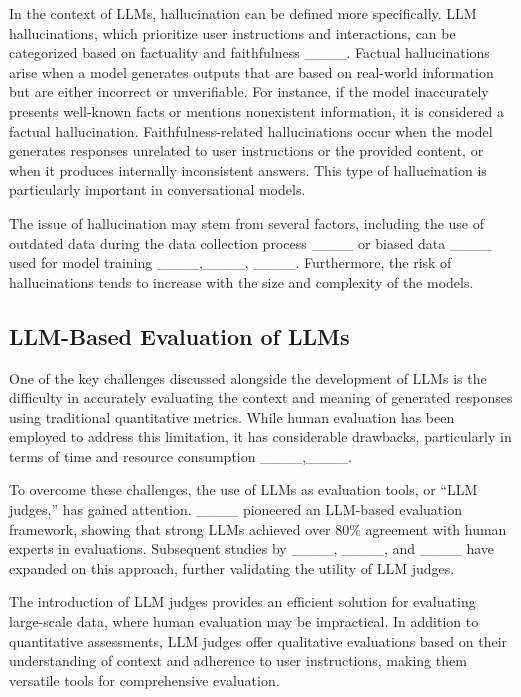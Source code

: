 In the context of LLMs, hallucination can be defined more specifically. LLM hallucinations, which prioritize user instructions and interactions, can be categorized based on factuality and faithfulness ____. Factual hallucinations arise when a model generates outputs that are based on real-world information but are either incorrect or unverifiable. For instance, if the model inaccurately presents well-known facts or mentions nonexistent information, it is considered a factual hallucination. Faithfulness-related hallucinations occur when the model generates responses unrelated to user instructions or the provided content, or when it produces internally inconsistent answers. This type of hallucination is particularly important in conversational models.

The issue of hallucination may stem from several factors, including the use of outdated data during the data collection process ____ or biased data ____ used for model training ____,____,  ____. Furthermore, the risk of hallucinations tends to increase with the size and complexity of the models.

\subsection{LLM-Based Evaluation of LLMs}
One of the key challenges discussed alongside the development of LLMs is the difficulty in accurately evaluating the context and meaning of generated responses using traditional quantitative metrics. While human evaluation has been employed to address this limitation, it has considerable drawbacks, particularly in terms of time and resource consumption ____,____.

To overcome these challenges, the use of LLMs as evaluation tools, or “LLM judges,” has gained attention. ____ pioneered an LLM-based evaluation framework, showing that strong LLMs achieved over 80\% agreement with human experts in evaluations. Subsequent studies by ____, ____, and ____ have expanded on this approach, further validating the utility of LLM judges.

The introduction of LLM judges provides an efficient solution for evaluating large-scale data, where human evaluation may be impractical. In addition to quantitative  assessments, LLM judges offer qualitative evaluations based on their understanding of context and adherence to user instructions, making them versatile tools for comprehensive evaluation.